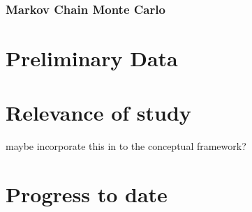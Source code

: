 \documentclass[12pt,a4paper]{article}
\begin{document}
            \subsubsection{Markov Chain Monte Carlo}
            
            
            
        
    \section{Preliminary Data}
    \section{Relevance of study}
        maybe incorporate this in to the conceptual framework?
        
    \section{Progress to date}
    
    

\end{document}
